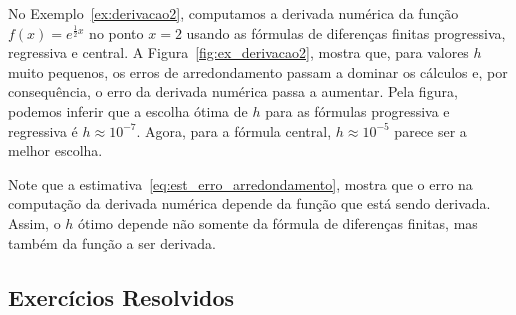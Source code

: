 \begin{ex}
No Exemplo~\ref{ex:derivacao2}, computamos a derivada numérica da função $f(x)=e^{\frac{1}{2}x}$ no ponto $x=2$ usando as fórmulas de diferenças finitas progressiva, regressiva e central. A Figura~\ref{fig:ex_derivacao2}, mostra que, para valores $h$ muito pequenos, os erros de arredondamento passam a dominar os cálculos e, por consequência, o erro da derivada numérica passa a aumentar. Pela figura, podemos inferir que a escolha ótima de $h$ para as fórmulas progressiva e regressiva é $h\approx 10^{-7}$. Agora, para a fórmula central, $h\approx 10^{-5}$ parece ser a melhor escolha.
\end{ex}

\begin{obs}
  Note que a estimativa~\eqref{eq:est_erro_arredondamento}, mostra que o erro na computação da derivada numérica depende da função que está sendo derivada. Assim, o $h$ ótimo depende não somente da fórmula de diferenças finitas, mas também da função a ser derivada.
\end{obs}

\subsection*{Exercícios Resolvidos}

